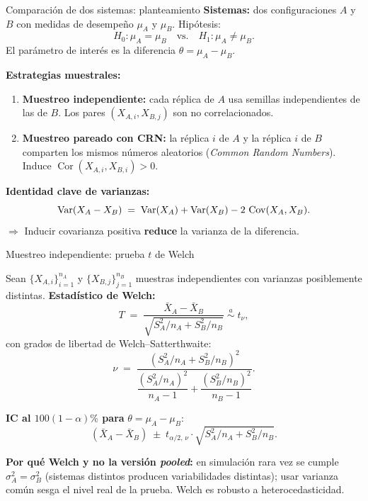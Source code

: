 \documentclass[aspectratio=1610, 10pt]{beamer}
\newcommand{\Cov}{\operatorname{Cov}}
\newcommand{\Cor}{\operatorname{Cor}}
\begin{document}
\begin{frame}{Comparación de dos sistemas: planteamiento}
\textbf{Sistemas:} dos configuraciones $A$ y $B$ con medidas de desempeño $\mu_A$ y $\mu_B$. Hipótesis:
\[
H_0: \mu_A = \mu_B \quad \text{vs.} \quad H_1: \mu_A \neq \mu_B.
\]
El parámetro de interés es la diferencia $\theta = \mu_A - \mu_B$.

\vspace{0.2cm}
\textbf{Estrategias muestrales:}
\begin{enumerate}
\item \textbf{Muestreo independiente:} cada réplica de $A$ usa semillas independientes de las de $B$. Los pares $(X_{A,i}, X_{B,j})$ son no correlacionados.
\item \textbf{Muestreo pareado con CRN:} la réplica $i$ de $A$ y la réplica $i$ de $B$ comparten los mismos números aleatorios (\emph{Common Random Numbers}). Induce $\Cor(X_{A,i}, X_{B,i}) > 0$.
\end{enumerate}

\vspace{0.2cm}
\textbf{Identidad clave de varianzas:}
\[
\Var(X_A - X_B) \;=\; \Var(X_A) + \Var(X_B) - 2\,\Cov(X_A, X_B).
\]
$\Rightarrow$ Inducir covarianza positiva \textbf{reduce} la varianza de la diferencia.
\end{frame}

\begin{frame}{Muestreo independiente: prueba $t$ de Welch}
\begin{definicionbox}
Sean $\{X_{A,i}\}_{i=1}^{n_A}$ y $\{X_{B,j}\}_{j=1}^{n_B}$ muestras independientes con varianzas posiblemente distintas. \textbf{Estadístico de Welch:}
\[
T \;=\; \frac{\bar X_A - \bar X_B}{\sqrt{S_A^2/n_A + S_B^2/n_B}} \;\stackrel{a}{\sim}\; t_\nu,
\]
con grados de libertad de Welch--Satterthwaite:
\[
\nu \;=\; \frac{(S_A^2/n_A + S_B^2/n_B)^2}{\dfrac{(S_A^2/n_A)^2}{n_A-1}+\dfrac{(S_B^2/n_B)^2}{n_B-1}}.
\]
\end{definicionbox}

\vspace{0.2cm}
\textbf{IC al $100(1-\alpha)\%$ para} $\theta = \mu_A - \mu_B$:
\[
(\bar X_A - \bar X_B) \;\pm\; t_{\alpha/2,\,\nu}\cdot\sqrt{S_A^2/n_A + S_B^2/n_B}.
\]

\textbf{Por qué Welch y no la versión \emph{pooled}:} en simulación rara vez se cumple $\sigma_A^2=\sigma_B^2$ (sistemas distintos producen variabilidades distintas); usar varianza común sesga el nivel real de la prueba. Welch es robusto a heterocedasticidad.
\end{frame}
\end{document}
